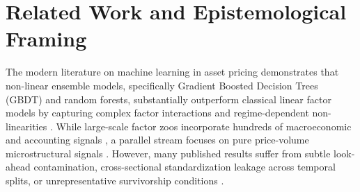 \documentclass[11pt,a4paper]{article}
\begin{document}
\section{Related Work and Epistemological Framing}
The modern literature on machine learning in asset pricing demonstrates that non-linear ensemble models, specifically Gradient Boosted Decision Trees (GBDT) and random forests, substantially outperform classical linear factor models by capturing complex factor interactions and regime-dependent non-linearities \cite{gu2020empirical}. While large-scale factor zoos incorporate hundreds of macroeconomic and accounting signals \cite{green2017characteristics}, a parallel stream focuses on pure price-volume microstructural signals \cite{jegadeesh1993returns, roll1984simple, amihud2002illiquidity}. However, many published results suffer from subtle look-ahead contamination, cross-sectional standardization leakage across temporal splits, or unrepresentative survivorship conditions \cite{arnott2019backtesting, lopez2018advances}.
\end{document}
